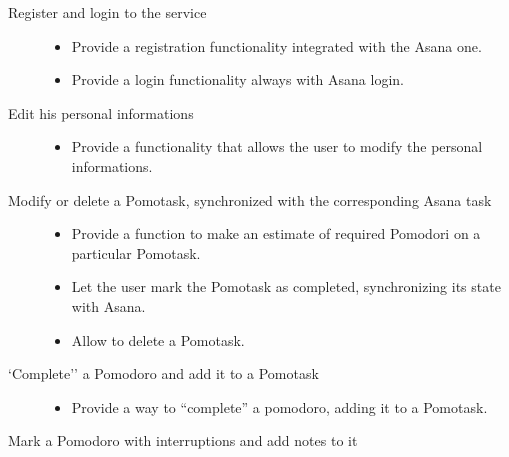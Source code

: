 	\begin{description}

		\item[Register and login to the service]\hfill
			
			\begin{itemize}

				\item Provide a registration functionality integrated with the Asana one.

				\item Provide a login functionality always with Asana login.

			\end{itemize}

		\item[Edit his personal informations]\hfill

			\begin{itemize}

				\item Provide a functionality that allows the user to modify the personal informations.

			\end{itemize}


		\item[Modify or delete a Pomotask, synchronized with the corresponding Asana task]\hfill

			\begin{itemize}

				\item Provide a function to make an estimate of required Pomodori on a particular Pomotask.

				\item Let the user mark the Pomotask as completed, synchronizing its state with Asana.

				\item Allow to delete a Pomotask.

			\end{itemize}

		\item[`Complete'' a Pomodoro and add it to a Pomotask]\hfill

			\begin{itemize}

				\item Provide a way to ``complete'' a pomodoro, adding it to a Pomotask.

			\end{itemize}

		\item[Mark a Pomodoro with interruptions and add notes to it]\hfill


\end{description}
